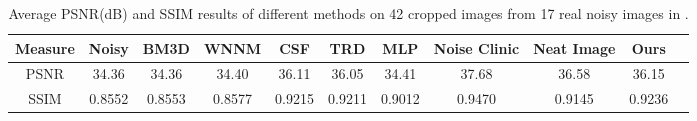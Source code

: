 \documentclass[10pt,twocolumn,letterpaper]{article}
\begin{document}
\begin{table}
\caption{Average PSNR(dB) and SSIM results of different methods on 42 cropped images from 17 real noisy images in \cite{crosschannel2016}.}
\label{tab1}
\begin{center}
\renewcommand\arraystretch{1}
\begin{tabular}{|c||c|c|c|c|c|c|c|c|c|c|}
\hline
Measure & \textbf{Noisy} &\textbf{BM3D}&\textbf{WNNM}&\textbf{CSF}&\textbf{TRD}&\textbf{MLP}& \textbf{Noise Clinic}& \textbf{Neat Image}&\textbf{Ours}
\\
\hline
PSNR& 34.36 & 34.36 & 34.40 & 36.11 & 36.05 & 34.41 & 37.68 & 36.58 & 36.15
\\
\hline
SSIM& 0.8552 & 0.8553 & 0.8577 & 0.9215 & 0.9211 & 0.9012 & 0.9470 & 0.9145 & 0.9236
\\
\hline
\end{tabular}
\end{center}
\end{table}
\end{document}
